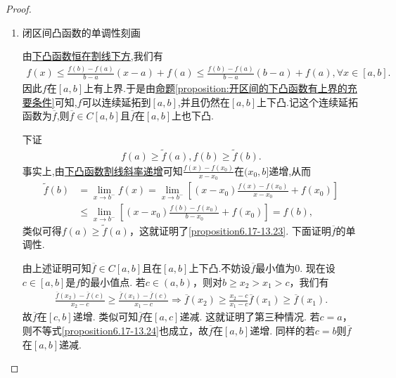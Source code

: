 \documentclass[../../main.tex]{subfiles}%
\begin{document}
\begin{proof}
\begin{enumerate}
\item {\heiti 闭区间凸函数的单调性刻画}

由\hyperref[下凸函数恒在割线下方]{下凸函数恒在割线下方},我们有
\begin{align*}
f\left( x \right) \leqslant \frac{f\left( b \right) -f\left( a \right)}{b-a}\left( x-a \right) +f\left( a \right) \leqslant \frac{f\left( b \right) -f\left( a \right)}{b-a}\left( b-a \right) +f\left( a \right) ,\forall x\in \left[ a,b \right] .
\end{align*}
因此$f$在$[a,b]$上有上界.于是由\hyperref[proposition:开区间的下凸函数有上界的充要条件]{命题\ref{proposition:开区间的下凸函数有上界的充要条件}}可知,$f$可以连续延拓到$[a,b]$,并且仍然在$[a,b]$上下凸.记这个连续延拓函数为$\overline{f}$,则$\overline{f} \in C[a,b]$且$\overline{f}$在$[a,b]$上也下凸.

下证
\begin{align}
f(a)\geqslant\tilde{f}(a),f(b)\geqslant\tilde{f}(b).\label{proposition6.17-13.23}
\end{align}
事实上,由\hyperref[下凸函数割线斜率递增]{下凸函数割线斜率递增}可知\(\frac{f(x)-f(x_0)}{x - x_0}\)在\((x_0,b]\)递增,从而
\begin{align*}
\tilde{f}(b)&=\lim_{x\rightarrow b^-}f(x)
=\lim_{x\rightarrow b^-}\left[(x - x_0)\frac{f(x)-f(x_0)}{x - x_0}+f(x_0)\right]\\
&\leqslant\lim_{x\rightarrow b^-}\left[(x - x_0)\frac{f(b)-f(x_0)}{b - x_0}+f(x_0)\right]
=f(b),
\end{align*}
类似可得\(f(a)\geqslant\tilde{f}(a)\)，这就证明了\eqref{proposition6.17-13.23}.
下面证明$\overline{f}$的单调性.

由上述证明可知\(\overline{f}\in C[a,b]\)且在$[a,b]$上下凸.不妨设\(\overline{f}\)最小值为\(0\). 现在设\(c\in[a,b]\)是\(f\)的最小值点. 若\(c\in(a,b)\)，则对\(b\geqslant x_2>x_1>c\)，我们有
\begin{align}
\frac{\overline{f}(x_2)-\overline{f}(c)}{x_2 - c}\geqslant\frac{\overline{f}(x_1)-\overline{f}(c)}{x_1 - c}\Rightarrow \overline{f}(x_2)\geqslant\frac{x_2 - c}{x_1 - c}\overline{f}(x_1)\geqslant \overline{f}(x_1).\label{proposition6.17-13.24} 
\end{align}
故\(\overline{f}\)在\([c,b]\)递增. 类似可知\(\overline{f}\)在\([a,c]\)递减. 这就证明了第三种情况. 若\(c = a\)，则不等式\eqref{proposition6.17-13.24}也成立，故\(\overline{f}\)在\([a,b]\)递增. 同样的若\(c = b\)则\(\overline{f}\)在\([a,b]\)递减.


\end{enumerate}
\end{proof}
\end{document}

